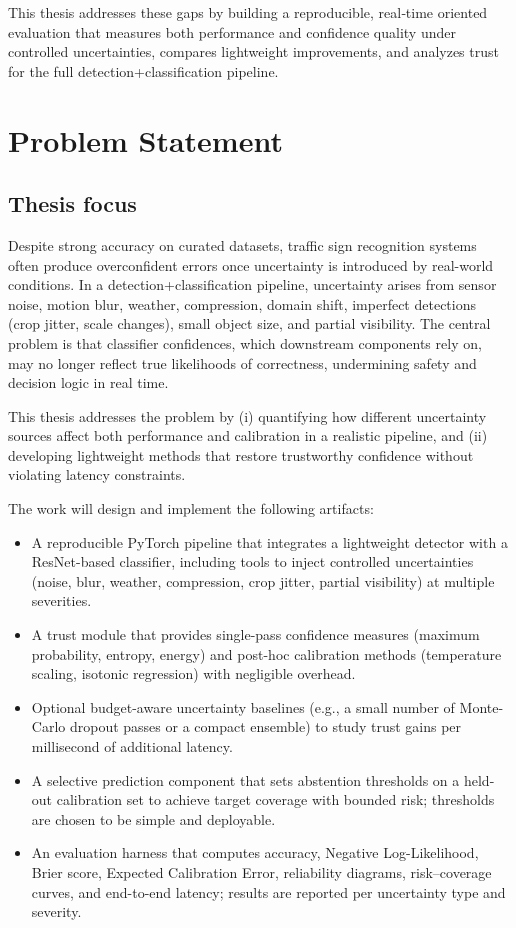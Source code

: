 \documentclass[11pt,a4paper]{article}
\begin{document}
This thesis addresses these gaps by building a reproducible, real‑time oriented evaluation that measures both performance and confidence quality under controlled uncertainties, compares lightweight improvements, and analyzes trust for the full detection+classification pipeline.

\section{Problem Statement}

\subsection{Thesis focus}

Despite strong accuracy on curated datasets, traffic sign recognition systems often produce overconfident errors once uncertainty is introduced by real-world conditions. In a detection+classification pipeline, uncertainty arises from sensor noise, motion blur, weather, compression, domain shift, imperfect detections (crop jitter, scale changes), small object size, and partial visibility. The central problem is that classifier confidences, which downstream components rely on, may no longer reflect true likelihoods of correctness, undermining safety and decision logic in real time.

This thesis addresses the problem by (i) quantifying how different uncertainty sources affect both performance and calibration in a realistic pipeline, and (ii) developing lightweight methods that restore trustworthy confidence without violating latency constraints.

The work will design and implement the following artifacts:

\begin{itemize}
  \item A reproducible PyTorch pipeline that integrates a lightweight detector with a ResNet-based classifier, including tools to inject controlled uncertainties (noise, blur, weather, compression, crop jitter, partial visibility) at multiple severities.
  \item A trust module that provides single-pass confidence measures (maximum probability, entropy, energy) and post-hoc calibration methods (temperature scaling, isotonic regression) with negligible overhead.
  \item Optional budget-aware uncertainty baselines (e.g., a small number of Monte-Carlo dropout passes or a compact ensemble) to study trust gains per millisecond of additional latency.
  \item A selective prediction component that sets abstention thresholds on a held-out calibration set to achieve target coverage with bounded risk; thresholds are chosen to be simple and deployable.
  \item An evaluation harness that computes accuracy, Negative Log-Likelihood, Brier score, Expected Calibration Error, reliability diagrams, risk–coverage curves, and end-to-end latency; results are reported per uncertainty type and severity.
\end{itemize}
\end{document}
